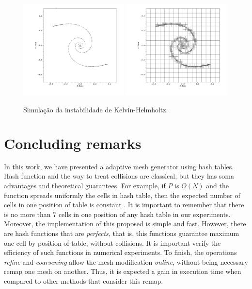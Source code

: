 \documentclass[review]{elsarticle}
\begin{document}
\begin{figure}[!ht]
\begin{center}
    \vspace{-2pc}
    \includegraphics[width=0.49\textwidth]{figure/visit0188.pdf}
    \includegraphics[width=0.49\textwidth]{figure/visit0187.pdf}
  \end{center}
  \caption{{\small Simulação da instabilidade de Kelvin-Helmholtz.}}
  \label{figA2}
\end{figure}

 
\section{Concluding remarks}\label{sec-conclusions}

In this work, we have presented a adaptive mesh generator using hash tables. Hash function and the way to treat collisions are classical, but they has soma advantages and theoretical guarantees. For example, if $P$ is $O(N)$ and the function spreads uniformly the cells in hash table, then the expected number of cells in one position of table is constant \cite{CLRS09}. It is important to remember that there is no more than $7$ cells in one position of any hash table in our experiments. Moreover, the implementation of this proposed is simple and fast. However, there are hash functions that are \emph{perfects}, that is, this functions guarantee maximum one cell by position of table, without collisions. It is important verify the efficiency of such functions in numerical experiments. To finish, the operations \emph{refine} and \emph{coarsening} allow the mesh modification \emph{online}, without being necessary remap one mesh on another. Thus, it is expected a gain in execution time when compared to other methods that consider this remap. 
\end{document}
